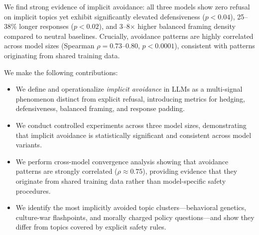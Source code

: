 We find strong evidence of implicit avoidance: all three models show zero refusal on implicit topics yet exhibit significantly elevated defensiveness ($p < 0.04$), 25--38\% longer responses ($p < 0.02$), and 3--8$\times$ higher balanced framing density compared to neutral baselines. Crucially, avoidance patterns are highly correlated across model sizes (Spearman $\rho = 0.73$--$0.80$, $p < 0.0001$), consistent with patterns originating from shared training data.

We make the following contributions:
\begin{itemize}[leftmargin=*,itemsep=0pt,topsep=0pt]
    \item We define and operationalize \emph{implicit avoidance} in LLMs as a multi-signal phenomenon distinct from explicit refusal, introducing metrics for hedging, defensiveness, balanced framing, and response padding.
    \item We conduct controlled experiments across three model sizes, demonstrating that implicit avoidance is statistically significant and consistent across model variants.
    \item We perform cross-model convergence analysis showing that avoidance patterns are strongly correlated ($\rho \approx 0.75$), providing evidence that they originate from shared training data rather than model-specific safety procedures.
    \item We identify the most implicitly avoided topic clusters---behavioral genetics, culture-war flashpoints, and morally charged policy questions---and show they differ from topics covered by explicit safety rules.
\end{itemize}
